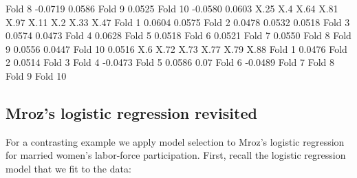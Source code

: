 \documentclass[
]{jss}
\begin{document}
\begin{CodeChunk}
\begin{CodeOutput}
Fold 8  -0.0719                                          0.0586                
Fold 9                   0.0525                                                
Fold 10 -0.0580                                  0.0603                        
           X.25     X.4    X.64    X.81    X.97    X.11     X.2    X.33    X.47
Fold 1                                   0.0604          0.0575                
Fold 2   0.0478          0.0532  0.0518                                        
Fold 3                           0.0574                          0.0473        
Fold 4                   0.0628                                                
Fold 5   0.0518                                                                
Fold 6                                           0.0521                        
Fold 7           0.0550                                                        
Fold 8                                                                         
Fold 9                                   0.0556                          0.0447
Fold 10          0.0516                                                        
            X.6    X.72    X.73    X.77    X.79 X.88
Fold 1   0.0476                                     
Fold 2                   0.0514                     
Fold 3                                              
Fold 4                                  -0.0473     
Fold 5           0.0586                         0.07
Fold 6                          -0.0489             
Fold 7                                              
Fold 8                                              
Fold 9                                              
Fold 10                                             
\end{CodeOutput}
\end{CodeChunk}

\hypertarget{mrozs-logistic-regression-revisited}{%
\subsection{Mroz's logistic regression
revisited}\label{mrozs-logistic-regression-revisited}}

For a contrasting example we apply model selection to Mroz's logistic
regression for married women's labor-force participation. First, recall
the logistic regression model that we fit to the  data:
\end{document}

